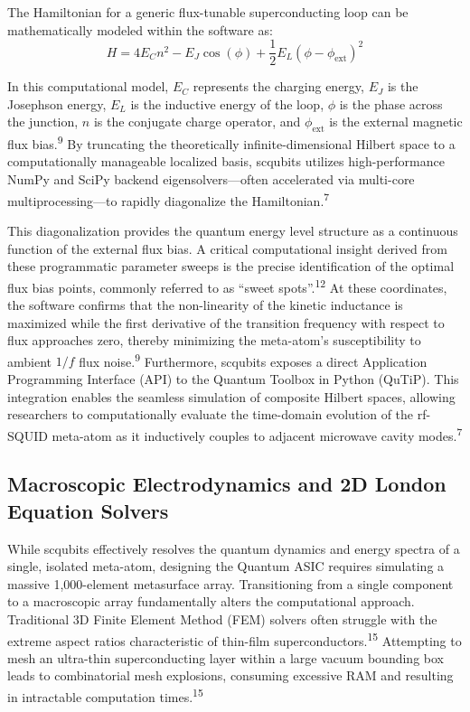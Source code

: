 \documentclass[11pt, a4paper]{article}
\begin{document}
The Hamiltonian for a generic flux-tunable superconducting loop can be mathematically modeled within the software as:
\begin{equation}
H = 4E_C n^2 - E_J \cos(\phi) + \frac{1}{2} E_L(\phi - \phi_{\text{ext}})^2
\end{equation}

In this computational model, $E_C$ represents the charging energy, $E_J$ is the Josephson energy, $E_L$ is the inductive energy of the loop, $\phi$ is the phase across the junction, $n$ is the conjugate charge operator, and $\phi_{\text{ext}}$ is the external magnetic flux bias.\textsuperscript{9} By truncating the theoretically infinite-dimensional Hilbert space to a computationally manageable localized basis, scqubits utilizes high-performance NumPy and SciPy backend eigensolvers---often accelerated via multi-core multiprocessing---to rapidly diagonalize the Hamiltonian.\textsuperscript{7}

This diagonalization provides the quantum energy level structure as a continuous function of the external flux bias. A critical computational insight derived from these programmatic parameter sweeps is the precise identification of the optimal flux bias points, commonly referred to as ``sweet spots''.\textsuperscript{12} At these coordinates, the software confirms that the non-linearity of the kinetic inductance is maximized while the first derivative of the transition frequency with respect to flux approaches zero, thereby minimizing the meta-atom's susceptibility to ambient $1/f$ flux noise.\textsuperscript{9} Furthermore, scqubits exposes a direct Application Programming Interface (API) to the Quantum Toolbox in Python (QuTiP). This integration enables the seamless simulation of composite Hilbert spaces, allowing researchers to computationally evaluate the time-domain evolution of the rf-SQUID meta-atom as it inductively couples to adjacent microwave cavity modes.\textsuperscript{7}

\subsection{Macroscopic Electrodynamics and 2D London Equation Solvers}

While scqubits effectively resolves the quantum dynamics and energy spectra of a single, isolated meta-atom, designing the Quantum ASIC requires simulating a massive 1,000-element metasurface array. Transitioning from a single component to a macroscopic array fundamentally alters the computational approach. Traditional 3D Finite Element Method (FEM) solvers often struggle with the extreme aspect ratios characteristic of thin-film superconductors.\textsuperscript{15} Attempting to mesh an ultra-thin superconducting layer within a large vacuum bounding box leads to combinatorial mesh explosions, consuming excessive RAM and resulting in intractable computation times.\textsuperscript{15}
\end{document}
